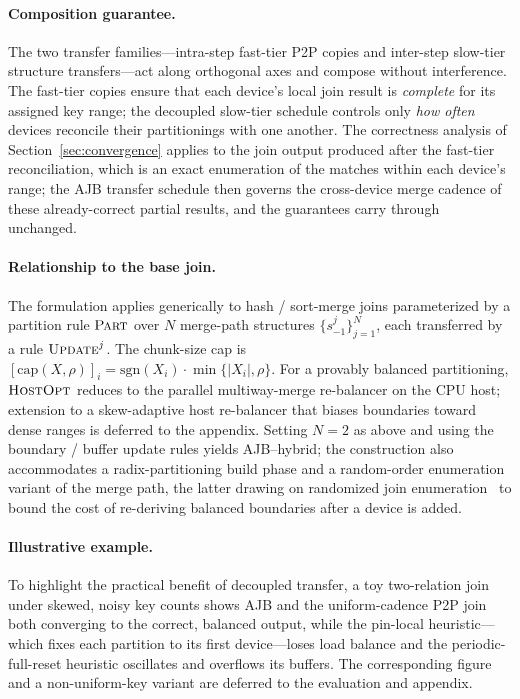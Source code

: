 \documentclass{article}
\begin{document}
\paragraph{Composition guarantee.}
The two transfer families---intra-step fast-tier P2P copies and inter-step
slow-tier structure transfers---act along orthogonal axes and compose without
interference. The fast-tier copies ensure that each device's local join result
is \emph{complete} for its assigned key range; the decoupled slow-tier schedule
controls only \emph{how often} devices reconcile their partitionings with one
another. The correctness analysis of Section~\ref{sec:convergence} applies to
the join output produced after the fast-tier reconciliation, which is an
exact enumeration of the matches within each device's range; the AJB transfer
schedule then governs the cross-device merge cadence of these already-correct
partial results, and the guarantees carry through unchanged.

\paragraph{Relationship to the base join.}
The formulation applies generically to hash / sort-merge joins parameterized by
a partition rule $\textsc{Part}$ over $N$ merge-path structures $\{s^j_{-1}\}_{j=1}^{N}$,
each transferred by a rule $\textsc{Update}^j$. The chunk-size cap is
$[\mathrm{cap}(X,\rho)]_i = \mathrm{sgn}(X_i)\cdot\min\{|X_i|,\rho\}$. For a
provably balanced partitioning, $\textsc{HostOpt}$ reduces to the parallel
multiway-merge re-balancer on the CPU host; extension to a skew-adaptive host
re-balancer that biases boundaries toward dense ranges is deferred to the
appendix. Setting $N = 2$ as above and using the boundary / buffer update rules
yields AJB--hybrid; the construction also accommodates a radix-partitioning
build phase and a random-order enumeration variant of the merge path, the latter
drawing on randomized join enumeration~\citep{chen2023renum} to bound the cost of
re-deriving balanced boundaries after a device is added.

\paragraph{Illustrative example.}
To highlight the practical benefit of decoupled transfer, a toy
two-relation join under skewed, noisy key counts shows AJB and the
uniform-cadence P2P join both converging to the correct, balanced output, while
the pin-local heuristic---which fixes each partition to its first device---loses
load balance and the periodic-full-reset heuristic oscillates and overflows its
buffers. The corresponding figure and a non-uniform-key variant are
deferred to the evaluation and appendix.
\end{document}

